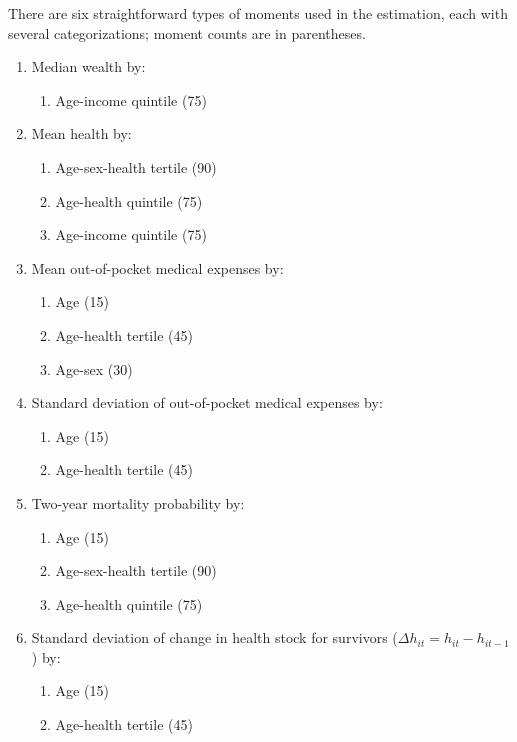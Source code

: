 \documentclass[12pt,pdftex,letterpaper]{article}
\newcommand{\Health}{h}
\begin{document}
There are six straightforward types of moments used in the estimation, each with several categorizations; moment counts are in parentheses.
\begin{enumerate}
\item Median wealth by:
\begin{enumerate}
\item Age-income quintile (75)

\end{enumerate}

\item Mean health by:
\begin{enumerate}
\item Age-sex-health tertile (90)

\item Age-health quintile (75)

\item Age-income quintile (75)
\end{enumerate}

\item Mean out-of-pocket medical expenses by:
\begin{enumerate}
\item Age (15)

\item Age-health tertile (45)

\item Age-sex (30)
\end{enumerate}

\item Standard deviation of out-of-pocket medical expenses by:
\begin{enumerate}
\item Age (15)

\item Age-health tertile (45)
\end{enumerate}

\item Two-year mortality probability by:
\begin{enumerate}
\item Age (15)

\item Age-sex-health tertile (90)

\item Age-health quintile (75)
\end{enumerate}

\item Standard deviation of change in health stock for survivors ($\Delta \Health_{it} = \Health_{it} - \Health_{it-1}$) by:
\begin{enumerate}
\item Age (15)

\item Age-health tertile (45)
\end{enumerate}
\end{enumerate}
\end{document}
